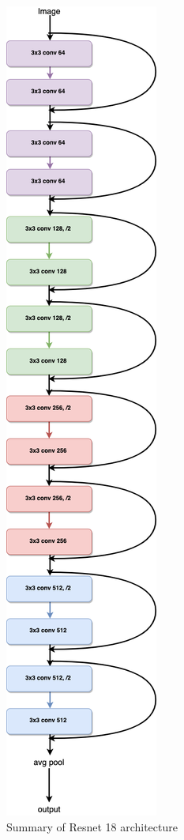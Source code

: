 			\begin{figure}[hbtp]
			\centering
			\includegraphics[width=\textwidth, angle=90]{fig/Research/Vision_Algorithm/algorithms/Resnet/Resnet18Diagram.png}
			\caption{Summary of Resnet 18 architecture}
			\label{fig:vis:resnet18summary}
			\end{figure}
			
